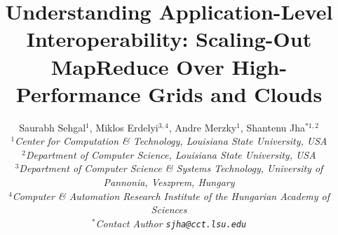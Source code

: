 \documentclass[3p,twocolumn]{elsarticle}
\begin{document}
\title{Understanding Application-Level Interoperability: Scaling-Out
  MapReduce Over High-Performance Grids and Clouds}

     \author{Saurabh Sehgal$^1$, Miklos Erdelyi$^{3,4}$, Andre Merzky$^{1}$, Shantenu Jha$^{*1,2}$
       \\
       \small{\emph{$^{1}$Center for Computation \& Technology, Louisiana State University, USA}}\\
       \small{\emph{$^{2}$Department of Computer Science, Louisiana State University, USA}}\\
       \small{\emph{$^{3}$Department of Computer Science \& Systems
           Technology, University of
           Pannonia, Veszprem, Hungary}}\\
       \small{\emph{$^{4}$Computer \& Automation Research Institute of
           the Hungarian Academy of
           Sciences}}\\
       \small{\emph{$^{*}$Contact Author \texttt{sjha@cct.lsu.edu}}}
       \upp\upp\upp\upp\upp
       }

\newif\ifdraft
\drafttrue
\ifdraft
 \newcommand{\amnote}[1]{     {\textcolor{magenta} { ***AM: #1 }}}
 \newcommand{\jhanote}[1]{    {\textcolor{red}     { ***SJ: #1 }}}
 \newcommand{\miklosnote}[1]{ {\textcolor{blue}    { ***ME: #1 }}}
 \newcommand{\ssnote}[1]{     {\textcolor{blue}    { ***SS: #1 }}}
\else
 \newcommand{\amnote}[1]{}
 \newcommand{\jhanote}[1]{}
 \newcommand{\miklosnote}[1]{}
 \newcommand{\ssnote}[1]{}
\fi

\newcommand{\sagamapreduce}{SAGA-MapReduce\xspace}
\newcommand{\smr}{\sagamapreduce}
\newcommand{\mr}{MapReduce\xspace}
\newcommand{\tc}{$T_c$\xspace}
\newcommand{\wc}{wordcount\xspace}
\newcommand{\Wc}{Wordcount\xspace}

\newcommand{\dn}{\vspace*{0.33em}}
\newcommand{\dnn}{\vspace*{0.66em}}
\newcommand{\dnnn}{\vspace*{1em}}
\newcommand{\uppp}{\vspace*{-1em}}
\newcommand{\upp}{\vspace*{-0.66em}}
\newcommand{\up}{\vspace*{-0.33em}}
\newcommand{\shift}{\hspace*{1.00em}}

\newcommand{\T}[1]{\texttt{#1}}
\newcommand{\I}[1]{\textit{#1}}
\newcommand{\B}[1]{\textbf{#1}}
\newcommand{\F}[1]{\B{[FIXME: #1]}}
\newcommand{\TODO}[1]{\textcolor{red}{\B{TODO: #1}}}
\end{document}
